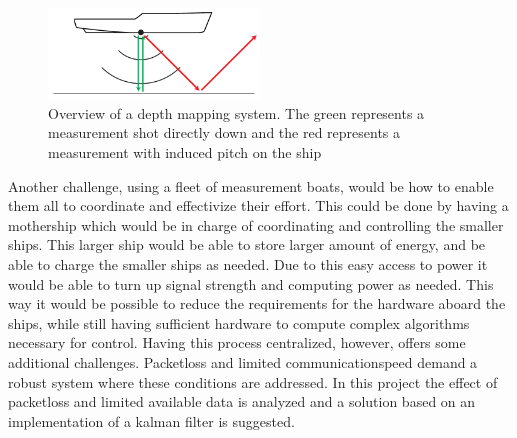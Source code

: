 \begin{figure}[h]
\centering
\includegraphics[width=0.5\textwidth]{img/beamer}
\caption{Overview of a depth mapping system. The green represents a measurement shot directly down and the red represents a measurement with induced pitch on the ship}
\label{fig:beamer}
\end{figure}

Another challenge, using a fleet of measurement boats, would be how to enable them all to coordinate and effectivize their effort. This could be done by having a mothership which would be in charge of coordinating and controlling the smaller ships. This larger ship would be able to store larger amount of energy, and be able to charge the smaller ships as needed. Due to this easy access to power it would be able to turn up signal strength and computing power as needed. This way it would be possible to reduce the requirements for the hardware aboard the ships, while still having sufficient hardware to compute complex algorithms necessary for control. Having this process centralized, however, offers some additional challenges. Packetloss and limited communicationspeed demand a robust system where these conditions are addressed. In this project the effect of packetloss and limited available data is analyzed and a solution based on an implementation of a kalman filter is suggested.
